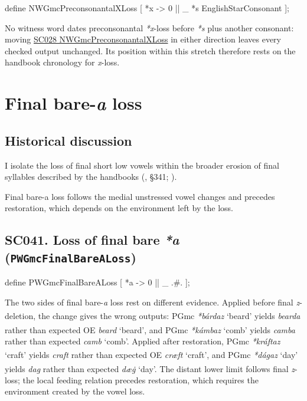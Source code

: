 \documentclass[
  british,
  a4paper,
  openany]{book}
\providecommand{\Pred}[1]{\textsuperscript{\dag}\emph{#1}}
\providecommand{\Recon}[1]{\emph{*#1}}
{\catcode`→=\active \global\def→{\ensuremath{\rightarrow}}}
\providecommand{\texorpdfstring}[2]{#1}
\providecommand{\Pred}[1]{\textsuperscript{\dag}\emph{#1}}
\providecommand{\Recon}[1]{\emph{*#1}}
{\catcode`→=\active \global\def→{\ensuremath{\rightarrow}}}
\begin{document}
\begin{ReaderFacingFoma}
define NWGmcPreconsonantalXLoss [
    {*x} -> 0 || _ {*s} EnglishStarConsonant
];
\end{ReaderFacingFoma}

No witness word dates preconsonantal \emph{*x}-loss before \emph{*s}
plus another consonant: moving
\hyperref[rule-NWGmcPreconsonantalXLoss]{SC028 NWGmcPreconsonantalXLoss}
in either direction leaves every checked output unchanged. Its position
within this stretch therefore rests on the handbook chronology for
\emph{x}-loss.

\newpage

\section{\texorpdfstring{Final bare-\emph{a}
loss}{Final bare- loss}}\label{final-bare--loss}

\subsection{Historical discussion}\label{historical-discussion-20}

I isolate the loss of final short low vowels within the broader erosion
of final syllables described by the handbooks
(, §341;
).

Final bare-a loss follows the medial unstressed vowel changes and
precedes restoration, which depends on the environment left by the loss.

\subsection{\texorpdfstring{SC041. Loss of final bare \emph{*a}
(\texttt{PWGmcFinalBareALoss})}{SC041. Loss of final bare  (PWGmcFinalBareALoss)}}\label{rule-PWGmcFinalBareALoss}

\begin{ReaderFacingFoma}
define PWGmcFinalBareALoss [
    {*a} -> 0 || _ .#.
];
\end{ReaderFacingFoma}

The two sides of final bare-\emph{a} loss rest on different evidence.
Applied before final \emph{z}-deletion, the change gives the wrong
outputs: PGmc \Recon{bárdaz} `beard' yields \Pred{bearda} rather than
expected OE \emph{beard} `beard', and PGmc \Recon{kámbaz} `comb' yields
\Pred{camba} rather than expected \emph{camb} `comb'. Applied after
restoration, PGmc \Recon{kráftaz} `craft' yields \Pred{craft} rather
than expected OE \emph{cræft} `craft', and PGmc \Recon{dágaz} `day'
yields \Pred{dag} rather than expected \emph{dæġ} `day'. The distant
lower limit follows final \emph{z}-loss; the local feeding relation
precedes restoration, which requires the environment created by the
vowel loss.
\end{document}
